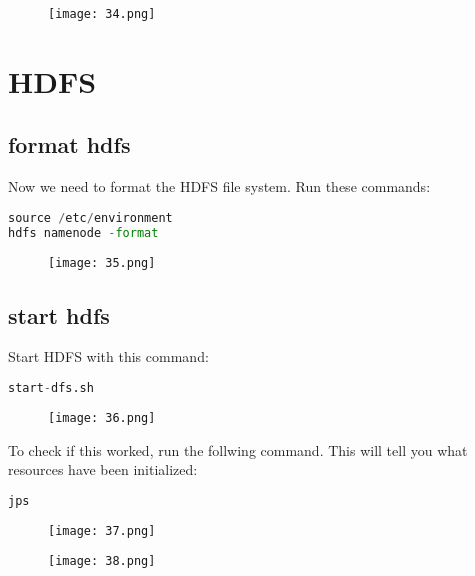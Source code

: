 \documentclass[onecolumn]{article}
\begin{document}
\begin{figure}[ht!]
\centering
\texttt{[image: 34.png]}
\caption{\label{}}
\end{figure}

\section{HDFS}

\subsection{format hdfs}
Now we need to format the HDFS file system. Run these commands:

\begin{lstlisting}[language=Python, caption= a ]
source /etc/environment
hdfs namenode -format
\end{lstlisting}

\begin{figure}[ht!]
\centering
\texttt{[image: 35.png]}
\caption{\label{}}
\end{figure}


\subsection{start hdfs}

Start HDFS with this command:

\begin{lstlisting}[language=Python, caption= a ]
start-dfs.sh
\end{lstlisting}


\begin{figure}[ht!]
\centering
\texttt{[image: 36.png]}
\caption{\label{}}
\end{figure}


To check if this worked, run the follwing command. This will tell you what resources have been initialized:

\begin{lstlisting}[language=Python, caption= for all nodes ]
jps
\end{lstlisting}


\begin{figure}[ht!]
\centering
\texttt{[image: 37.png]}
\caption{\label{}}
\end{figure}


\begin{figure}[ht!]
\centering
\texttt{[image: 38.png]}
\caption{\label{}}
\end{figure}
\end{document}
